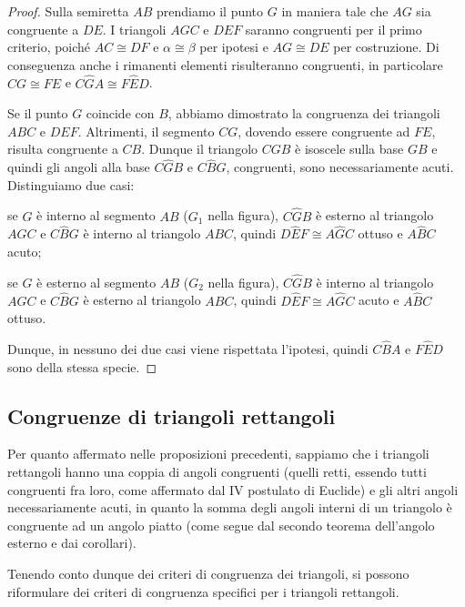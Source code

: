\begin{proof}
Sulla semiretta $AB$ prendiamo il punto $G$ in maniera tale che $AG$ sia congruente a $DE$. I triangoli $AGC$ e $DEF$ saranno congruenti per il primo criterio, poiché $AC\cong DF$ e $\alpha\cong \beta$ per ipotesi e $AG\cong DE$ per costruzione. Di conseguenza anche i rimanenti elementi risulteranno congruenti, in particolare $CG\cong FE$ e $C\widehat{G}A\cong F\widehat{E}D$.

Se il punto $G$ coincide con $B$, abbiamo dimostrato la congruenza dei triangoli $ABC$ e $DEF$. Altrimenti, il segmento $CG$, dovendo essere congruente ad $FE$, risulta congruente a $CB$. Dunque il triangolo $CGB$ è isoscele sulla base $GB$ e quindi gli angoli alla base $C\widehat{G}B$ e $C\widehat{B}G$, congruenti, sono necessariamente acuti. Distinguiamo due casi:
\begin{itemize*}
\item se $G$ è interno al segmento $AB$ ($G_1$ nella figura), $C\widehat{G}B$ è esterno al triangolo $AGC$ e $C\widehat{B}G$ è interno al triangolo $ABC$, quindi $D\widehat{E}F\cong A\widehat{G}C$ ottuso e $A\widehat{B}C$ acuto;
\item se $G$ è esterno al segmento $AB$ ($G_2$ nella figura), $C\widehat{G}B$ è interno al triangolo $AGC$ e $C\widehat{B}G$ è esterno al triangolo $ABC$, quindi $D\widehat{E}F\cong A\widehat{G}C$ acuto e $A\widehat{B}C$ ottuso.
\end{itemize*}
Dunque, in nessuno dei due casi viene rispettata l'ipotesi, quindi $C\widehat{B}A$ e $F\widehat{E}D$ sono della stessa specie.
\end{proof}

\subsection{Congruenze di triangoli rettangoli}

Per quanto affermato nelle proposizioni precedenti, sappiamo che i triangoli rettangoli hanno una coppia di angoli congruenti (quelli retti, essendo tutti congruenti fra loro, come affermato dal IV postulato di Euclide) e gli altri angoli necessariamente acuti, in quanto la somma degli angoli interni di un triangolo è congruente ad un angolo piatto (come segue dal secondo teorema dell'angolo esterno e dai corollari).

Tenendo conto dunque dei criteri di congruenza dei triangoli, si possono riformulare dei criteri di congruenza specifici per i triangoli rettangoli.

